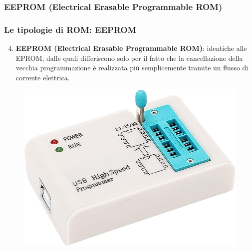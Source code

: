 \subsubsection[EEPROM (Electrical  Erasable  Programmable  ROM)]{EEPROM (Electrical  Erasable  Programmable  ROM)}
\begin{frame}
	\frametitle{Le tipologie di ROM: EEPROM}
	  
	\begin{block}{}

		\begin{enumerate}
			\setcounter{enumi}{3}
			\item \textbf{EEPROM (Electrical  Erasable  Programmable  ROM)}: identiche alle EPROM, dalle quali differiscono solo per il fatto che la cancellazione della vecchia programmazione è realizzata più semplicemente tramite un flusso di corrente elettrica. 
		\end{enumerate}
		
	\end{block}
	
	\begin{figure}[!htbp] 
		\centering
		\includegraphics[width=0.55\linewidth]{images/5_memory/eeprom_programmer.jpg}
	\end{figure}
	
\end{frame}




